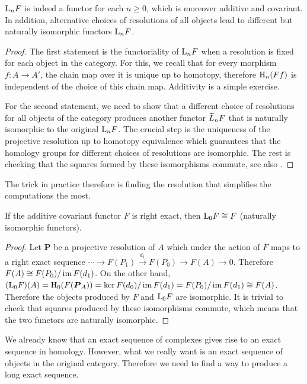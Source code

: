 \begin{prop}
    $\mathrm{L}_n F$ is indeed a functor for each $n\geq 0$, which is moreover additive and covariant. In addition, alternative choices of resolutions of all objects lead to different but naturally isomorphic functors $\mathrm{L}_n F$.
\end{prop}
\begin{proof}
     The first statement is the functoriality of $\mathrm{L}_n F$ when a resolution is fixed for each object in the category. For this, we recall that for every morphism $f:A\to A'$, the chain map over it is unique up to homotopy, therefore $\mathrm{H}_n(F f)$ is independent of the choice of this chain map. Additivity is a simple exercise.
     
     For the second statement, we need to show that a different choice of resolutions for all objects of the category produces another functor $\wt{L}_n F$ that is naturally isomorphic to the original $\mathrm{L}_n F$. The crucial step is the uniqueness of the projective resolution up to homotopy equivalence which guarantees that the homology groups for different choices of resolutions are isomorphic. The rest is checking that the squares formed by these isomorphisms commute, see also \cite[Prop.~6.20]{Rotman}.
\end{proof}


The trick in practice therefore is finding the resolution that simplifies the computations the most.


\begin{lem}
    If the additive covariant functor $F$ is right exact, then $\mathrm{L}_0 F\cong F$ (naturally isomorphic functors).
\end{lem}
\begin{proof}
     Let $\bm{P}$ be a projective resolution of $A$ which under the action of $F$ maps to a right exact sequence $\cdots\to F(P_1)\overset{d_1}\to F(P_0)\to F(A)\to 0$. Therefore $F(A)\cong F(P_0)/\operatorname{im} F(d_1)$. On the other hand, $(\mathrm{L}_0 F)(A)=\mathrm{H}_0(F(\boldsymbol{P}_A))=\ker F(d_0)/\operatorname{im} F(d_1)=F(P_0)/\operatorname{im} F(d_1)\cong F(A)$. Therefore the objects produced by $F$ and $\mathrm{L}_0F$ are isomorphic. It is trivial to check that squares produced by these isomorphisms commute, which means that the two functors are naturally isomorphic.
\end{proof}


We already know that an exact sequence of complexes gives rise to an exact sequence in homology. However, what we really want is an exact sequence of objects in the original category. Therefore we need to find a way to produce a long exact sequence.

